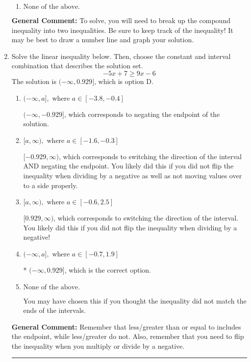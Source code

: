 \documentclass{extbook}[14pt]
\newcommand{\litem}[1]{\item #1

\rule{\textwidth}{0.4pt}}
\begin{document}
\begin{enumerate}
{\begin{enumerate}[label=\Alph*.]
$(2.36, 4.60]$, which corresponds to flipping the inequality.
\item \( \text{None of the above.} \)


\end{enumerate}

\textbf{General Comment:} To solve, you will need to break up the compound inequality into two inequalities. Be sure to keep track of the inequality! It may be best to draw a number line and graph your solution.
}
\litem{
Solve the linear inequality below. Then, choose the constant and interval combination that describes the solution set.
\[ -5x + 7 \geq 9x -6 \]The solution is \( (-\infty, 0.929] \), which is option D.\begin{enumerate}[label=\Alph*.]
\item \( (-\infty, a], \text{ where } a \in [-3.8, -0.4] \)

 $(-\infty, -0.929]$, which corresponds to negating the endpoint of the solution.
\item \( [a, \infty), \text{ where } a \in [-1.6, -0.3] \)

 $[-0.929, \infty)$, which corresponds to switching the direction of the interval AND negating the endpoint. You likely did this if you did not flip the inequality when dividing by a negative as well as not moving values over to a side properly.
\item \( [a, \infty), \text{ where } a \in [-0.6, 2.5] \)

 $[0.929, \infty)$, which corresponds to switching the direction of the interval. You likely did this if you did not flip the inequality when dividing by a negative!
\item \( (-\infty, a], \text{ where } a \in [-0.7, 1.9] \)

* $(-\infty, 0.929]$, which is the correct option.
\item \( \text{None of the above}. \)

You may have chosen this if you thought the inequality did not match the ends of the intervals.
\end{enumerate}

\textbf{General Comment:} Remember that less/greater than or equal to includes the endpoint, while less/greater do not. Also, remember that you need to flip the inequality when you multiply or divide by a negative.
}
\end{enumerate}
\end{document}
